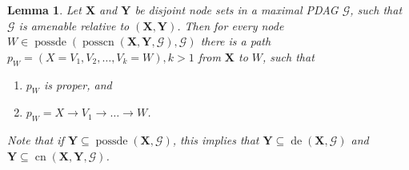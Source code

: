 \documentclass[11pt,a4paper]{article}
\newtheorem{Lemma}[Satz]{Lemma}
\theoremstyle{definition}
\theoremstyle{remark}
\DeclareMathOperator{\Forbb}{forb}
\DeclareMathOperator{\de}{de}
\DeclareMathOperator{\possde}{possde}
\DeclareMathOperator{\CN}{cn}
\DeclareMathOperator{\possCN}{posscn}
\newcommand{\mpdag}{maximal PDAG}
\newcommand{\g}[1][G]{\mathcal{#1}}
\newcommand{\fb}[2][X,Y]{\Forbb(\mathbf{#1},#2)}
\newcommand{\cnb}[2][X,Y]{\CN(\mathbf{#1},#2)}
\newcommand{\posscnb}[2][X,Y]{\possCN(\mathbf{#1},#2)}
\begin{document}
\begin{Lemma}
	Let $\mathbf{X}$ and $\mathbf{Y}$ be disjoint node sets in a \mpdag{} $\g$, such that $\g$ is amenable relative to $(\mathbf{X,Y})$. Then for every node $W \in \possde(\posscnb{\g},\g)$
	there is a path $p_W = ( X = V_1, V_2, \dots ,V_k=W ), k > 1$ from $\mathbf{X}$ to $W$, such that 
	\begin{enumerate}[label=(\arabic*)]
		
		\item\label{l:sm-l1} $p_W$ is proper, and 
		\item\label{l:sm-l2} $p_W = X \rightarrow V_1 \rightarrow \dots \rightarrow W$. 
	\end{enumerate}
	Note that if $\mathbf{Y} \subseteq \possde(\mathbf{X},\g)$, this implies that $\mathbf{Y} \subseteq \de(\mathbf{X},\g)$ and $\mathbf{Y} \subseteq \cnb{\g}$.
	\label{lemma:additional-1}
\end{Lemma}
\end{document}
